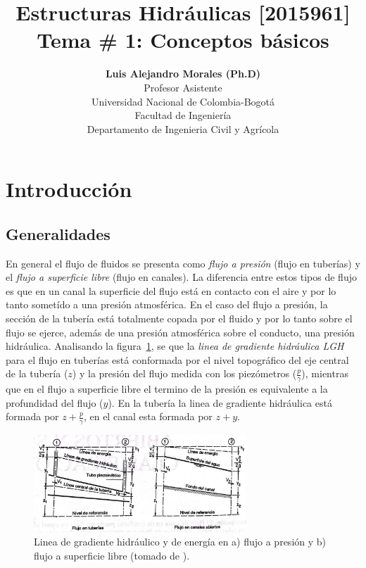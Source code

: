 \documentclass[11pt, oneside]{article}
\title{Estructuras Hidr\'aulicas [2015961] \\ \textbf{Tema \# 1: Conceptos b\'asicos}}
\author{\textbf{Luis Alejandro Morales (Ph.D)}\\ \vspace{0.4cm} Profesor Asistente \\ Universidad Nacional de Colombia-Bogot\'a\\Facultad de Ingenier\'ia \\ Departamento de Ingenieria Civil y Agr\'icola}
\date{}
\begin{document}
\maketitle
\tableofcontents


\section{Introducci\'on} %
\subsection{Generalidades}
En general el flujo de fluidos se presenta como \emph{flujo a presi\'on} (flujo en tuber\'ias) y el \emph{flujo a superficie libre} (flujo en canales). La diferencia entre estos tipos de flujo es que en un canal la superficie del flujo est\'a en contacto con el aire y por lo tanto somet\'ido a una presi\'on atmosf\'erica. En el caso del flujo a presi\'on, la secci\'on de la tuber\'ia est\'a totalmente copada por el fluido y por lo tanto sobre el flujo se ejerce, adem\'as de una presi\'on atmosf\'erica sobre el conducto, una presi\'on hidr\'aulica. Analisando la figura~\ref{fig1}, se que la \emph{linea de gradiente hidr\'aulica {LGH}} para el flujo en tuber\'ias est\'a conformada por el nivel topogr\'afico del eje central de la tuber\'ia ($z$) y la presi\'on del flujo medida con los piez\'ometros ($\frac{p}{\gamma}$), mientras que en el flujo a superficie libre el termino de la presi\'on es equivalente a la profundidad del flujo ($y$). En la tuber\'ia la linea de gradiente hidr\'aulica est\'a formada por $z + \frac{p}{\gamma}$, en el canal esta formada por $z+y$. 
\begin{figure}[h]
\centering
\includegraphics[width=8cm]{fig1.jpeg}
\caption{Linea de gradiente hidr\'aulico y de energ\'ia en a) flujo a presi\'on y b) flujo a superficie libre (tomado de \cite{VChow}).}
\label{fig1}
\end{figure}
\end{document}
